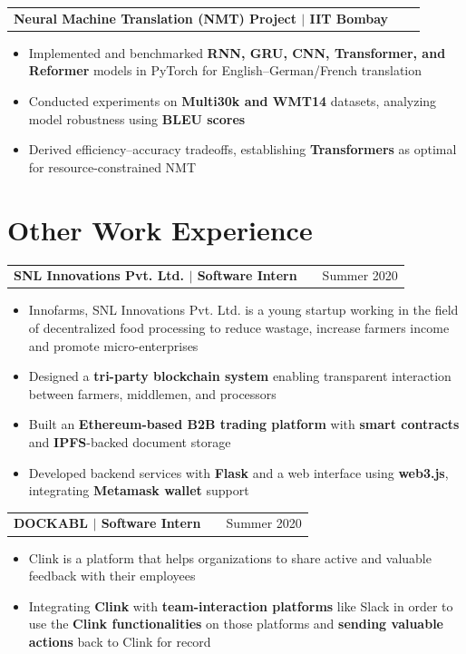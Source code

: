 \documentclass[a4paper,10pt]{article}
\makeatletter
\newenvironment{joblong}[2]
    {
    \begin{tabularx}{\linewidth}{@{}l X r@{}}
    \textbf{#1} & \hfill &  #2 \\[3.75pt]
    \end{tabularx}
    \begin{minipage}[t]{\linewidth}
    \begin{itemize}[nosep,after=\strut, leftmargin=1em, itemsep=3pt,label=--]
    }
    {
    \end{itemize}
    \end{minipage}
    }
\makeatother
\begin{document}
\begin{joblong}{{\color{adobeblue}Neural Machine Translation (NMT) Project} $|$ IIT Bombay}{}
\item Implemented and benchmarked \textbf{RNN, GRU, CNN, Transformer, and Reformer} models in PyTorch for English–German/French translation
\item Conducted experiments on \textbf{Multi30k and WMT14} datasets, analyzing model robustness using \textbf{BLEU scores}
\item Derived efficiency–accuracy tradeoffs, establishing \textbf{Transformers} as optimal for resource-constrained NMT
\end{joblong}

\section{Other Work Experience}

\begin{joblong}{{\color{adobeblue}SNL Innovations Pvt. Ltd.} $|$ Software Intern}{Summer 2020}
\item Innofarms, SNL Innovations Pvt. Ltd. is a young startup working in the field of decentralized food processing to reduce wastage, increase farmers income and promote micro-enterprises
\item Designed a \textbf{tri-party blockchain system} enabling transparent interaction between farmers, middlemen, and processors
\item Built an \textbf{Ethereum-based B2B trading platform} with \textbf{smart contracts} and \textbf{IPFS}-backed document storage
\item Developed backend services with \textbf{Flask} and a web interface using \textbf{web3.js}, integrating \textbf{Metamask wallet} support
\end{joblong}

\begin{joblong}{ {\color{adobeblue}DOCKABL} $|$ Software Intern}{Summer 2020}
\item Clink is a platform that helps organizations to share active and valuable feedback with their employees
\item Integrating \textbf{Clink} with \textbf{team-interaction platforms} like Slack in order to use the \textbf{Clink functionalities} on those platforms and \textbf{sending valuable actions} back to Clink for record
\end{joblong}

\end{document}
